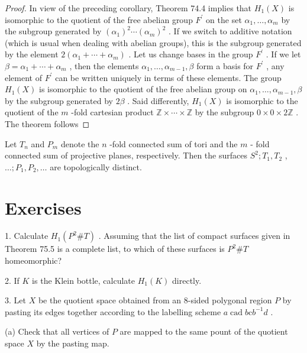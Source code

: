 \begin{proof}In view of the preceding corollary, Theorem 74.4 implies that \({H}_{1}\left( X\right)\) is isomorphic to the quotient of the free abelian group \({F}^{\prime }\) on the set \({\alpha }_{1},\ldots ,{\alpha }_{m}\) by the subgroup generated by \({\left( {\alpha }_{1}\right) }^{2}\cdots {\left( {\alpha }_{m}\right) }^{2}\) . If we switch to additive notation (which is usual when dealing with abelian groups), this is the subgroup generated by the element \(2\left( {{\alpha }_{1} + \cdots  + {\alpha }_{m}}\right)\) . Let us change bases in the group \({F}^{\prime }\) . If we let \(\beta  = {\alpha }_{1} + \cdots  + {\alpha }_{m}\) , then the elements \({\alpha }_{1},\ldots ,{\alpha }_{m - 1},\beta\) form a basis for \({F}^{\prime }\) , any element of \({F}^{\prime }\) can be written uniquely in terms of these elements. The group \({H}_{1}\left( X\right)\) is isomorphic to the quotient of the free abelian group on \({\alpha }_{1},\ldots ,{\alpha }_{m - 1},\beta\) by the subgroup generated by \({2\beta }\) . Said differently, \({H}_{1}\left( X\right)\) is isomorphic to the quotient of the \(m\) -fold cartesian product \(\mathbb{Z} \times  \cdots  \times  \mathbb{Z}\) by the subgroup \(0 \times  0 \times  2\mathbb{Z}\) . The theorem follows\end{proof}
\begin{theorem} Let \({T}_{n}\) and \({P}_{m}\) denote the \(n\) -fold connected sum of tori and the \(m\) - fold connected sum of projective planes, respectively. Then the surfaces \({S}^{2};{T}_{1},{T}_{2}\) , \(\ldots ;{P}_{1},{P}_{2},\ldots\) are topologically distinct.
\end{theorem}

\section*{Exercises}

1. Calculate \({H}_{1}\left( {{P}^{2}\# T}\right)\) . Assuming that the list of compact surfaces given in Theorem 75.5 is a complete list, to which of these surfaces is \({P}^{2}\# T\) homeomorphic?

2. If \(K\) is the Klein bottle, calculate \({H}_{1}\left( K\right)\) directly.

3. Let \(X\) be the quotient space obtained from an 8-sided polygonal region \(P\) by pasting its edges together according to the labelling scheme \(a\operatorname{cad}b\mathrm{c}{b}^{-1}d\) .

(a) Check that all vertices of \(P\) are mapped to the same pount of the quotient space \(X\) by the pasting map.

